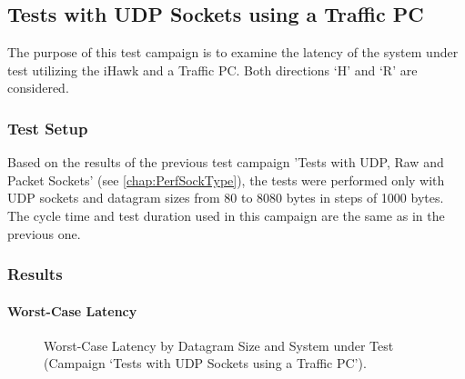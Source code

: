 \subsection{Tests with UDP Sockets using a Traffic PC}
The purpose of this test campaign is to examine the latency of the system under test utilizing the iHawk and a Traffic PC. Both directions `H' and `R' are considered.

\subsubsection{Test Setup}
Based on the results of the previous test campaign 'Tests with UDP, Raw and Packet Sockets' (see \ref{chap:PerfSockType}), the tests were performed only with UDP sockets and datagram sizes from 80 to 8080 bytes in steps of 1000 bytes. The cycle time and test duration used in this campaign are the same as in the previous one.

\subsubsection{Results}
\paragraph{Worst-Case Latency}

\begin{figure}[h!]
  \centering
  \caption{Worst-Case Latency by Datagram Size and System under Test (Campaign `Tests with UDP Sockets using a Traffic PC').}
  \label{fig:TrafficWc}
\end{figure}


